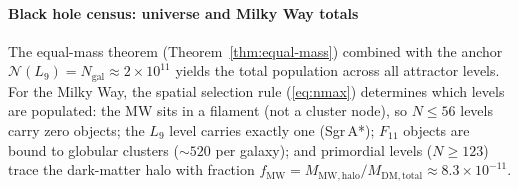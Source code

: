 \documentclass[12pt,a4paper]{article}
\begin{document}
\paragraph{Black hole census: universe and Milky Way totals}
\label{sec:bh-census}

The equal-mass theorem (Theorem~\ref{thm:equal-mass}) combined with the anchor $\mathcal{N}(L_9) = N_{\mathrm{gal}} \approx 2 \times 10^{11}$ yields the total population across all attractor levels.  For the Milky Way, the spatial selection rule (\ref{eq:nmax}) determines which levels are populated: the MW sits in a filament (not a cluster node), so $N \leq 56$ levels carry zero objects; the $L_9$ level carries exactly one (Sgr\,A*); $F_{11}$ objects are bound to globular clusters ($\sim 520$ per galaxy); and primordial levels ($N \geq 123$) trace the dark-matter halo with fraction $f_{\mathrm{MW}} = M_{\mathrm{MW,halo}}/M_{\mathrm{DM,total}} \approx 8.3 \times 10^{-11}$.
\end{document}
